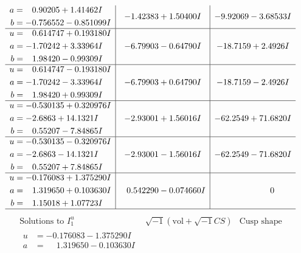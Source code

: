 \documentclass[1p]{elsarticle_modified}
\theoremstyle{definition}
\newcommand{\I}{\sqrt{-1}}
\begin{document}
$$\begin{array}{c|c|c}
\begin{aligned}
a &= \phantom{-}0.90205 + 1.41462 I \\
b &= -0.756552 - 0.851099 I\end{aligned}
 & -1.42383 + 1.50400 I & -9.92069 - 3.68533 I \\ \hline\begin{aligned}
u &= \phantom{-}0.614747 + 0.193180 I \\
a &= -1.70242 + 3.33964 I \\
b &= \phantom{-}1.98420 - 0.99309 I\end{aligned}
 & -6.79903 - 0.64790 I & -18.7159 + 2.4926 I \\ \hline\begin{aligned}
u &= \phantom{-}0.614747 - 0.193180 I \\
a &= -1.70242 - 3.33964 I \\
b &= \phantom{-}1.98420 + 0.99309 I\end{aligned}
 & -6.79903 + 0.64790 I & -18.7159 - 2.4926 I \\ \hline\begin{aligned}
u &= -0.530135 + 0.320976 I \\
a &= -2.6863 + 14.1321 I \\
b &= \phantom{-}0.55207 - 7.84865 I\end{aligned}
 & -2.93001 + 1.56016 I & -62.2549 + 71.6820 I \\ \hline\begin{aligned}
u &= -0.530135 - 0.320976 I \\
a &= -2.6863 - 14.1321 I \\
b &= \phantom{-}0.55207 + 7.84865 I\end{aligned}
 & -2.93001 - 1.56016 I & -62.2549 - 71.6820 I \\ \hline\begin{aligned}
u &= -0.176083 + 1.375290 I \\
a &= \phantom{-}1.319650 + 0.103630 I \\
b &= \phantom{-}1.15018 + 1.07723 I\end{aligned}
 & \phantom{-}0.542290 - 0.074660 I & \phantom{-0.000000 } 0\\
 \hline 
 \end{array}$$\newpage$$\begin{array}{c|c|c}  
\text{Solutions to }I^u_{1}& \I (\text{vol} + \sqrt{-1}CS) & \text{Cusp shape}\\
 \hline 
\begin{aligned}
u &= -0.176083 - 1.375290 I \\
a &= \phantom{-}1.319650 - 0.103630 I \\

\end{aligned}
\end{array}$$
\end{document}
